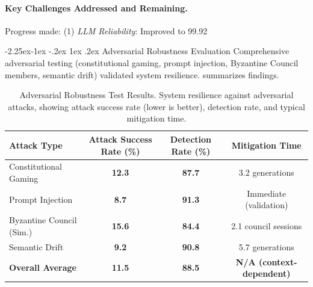 \documentclass[manuscript,screen,review,anonymous,9pt]{acmart}
\makeatletter
\renewcommand\subsection{\@startsection{subsection}{2}{\z@}%
  {-2.25ex\@plus -1ex \@minus -.2ex}%
  {1ex \@plus .2ex}%
  {\normalfont\large\bfseries}}
\newcommand{\tablesize}{\footnotesize}
\newcommand{\tablenumfmt}[1]{\textbf{#1}}
\makeatother
\begin{document}
\paragraph{Key Challenges Addressed and Remaining.}
Progress made: (1) \textit{LLM Reliability}: Improved to 99.92%

\subsection{Adversarial Robustness Evaluation}
\label{subsec:adversarial_robustness_discussion}
Comprehensive adversarial testing (constitutional gaming, prompt injection, Byzantine Council members, semantic drift) validated system resilience.  summarizes findings.
\begin{table}[htbp]
\centering
\caption{Adversarial Robustness Test Results. System resilience against adversarial attacks, showing attack success rate (lower is better), detection rate, and typical mitigation time.}
\label{tab:adversarial_results}
\tablesize
\begin{tabular}{@{}lccc@{}}
\toprule
\textbf{Attack Type} & \textbf{Attack Success Rate (\%)} & \textbf{Detection Rate (\%)} & \textbf{Mitigation Time} \\
\midrule
Constitutional Gaming & \tablenumfmt{12.3} & \tablenumfmt{87.7} & 3.2 generations \\
Prompt Injection      & \tablenumfmt{8.7}  & \tablenumfmt{91.3} & Immediate (validation) \\
Byzantine Council (Sim.) & \tablenumfmt{15.6} & \tablenumfmt{84.4} & 2.1 council sessions \\
Semantic Drift        & \tablenumfmt{9.2}  & \tablenumfmt{90.8} & 5.7 generations \\
\midrule
\textbf{Overall Average} & \textbf{\tablenumfmt{11.5}} & \textbf{\tablenumfmt{88.5}} & \textbf{N/A (context-dependent)} \\
\bottomrule
\end{tabular}
\end{table}
\end{document}
